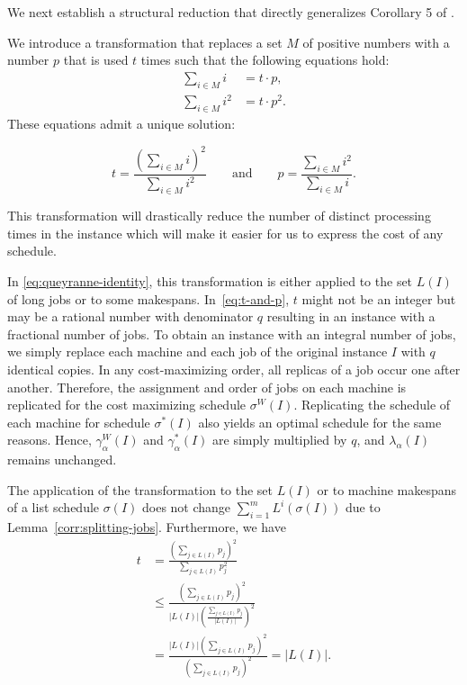 \documentclass[%
english, titlepage=false %
]{./tum-templates/book/tumbook}
\newcommand{\LamI}{\lambda_{\alpha}(I)}
\begin{document}
We next establish a structural reduction that directly generalizes Corollary 5 of \cite{Schwiegelshohn:2011}.

We introduce a transformation that replaces a set $M$ of positive
numbers with a number $p$ that is used $t$ times such that the following
equations hold:
\begin{align}
        \sum_{i\in M} i &= t\cdot p, \\
        \sum_{i\in M} i^2 &= t\cdot p^2.
\end{align}
These equations admit a unique solution:

\begin{equation}
\label{eq:t-and-p}
t=\frac{\left(\sum_{i\in M} i\right)^2}{\sum_{i\in M} i^2}
\qquad\text{and}\qquad
p=\frac{\sum_{i\in M} i^2}{\sum_{i\in M} i}.
\end{equation}

This transformation will drastically reduce the number of distinct processing times 
in the instance which will make it easier for us to express the cost of any schedule. 

In \eqref{eq:queyranne-identity}, this transformation is either applied to the set $L(I)$ of long
jobs or to some makespans. In~\eqref{eq:t-and-p}, $t$ might not be an integer but may be a
rational number with denominator $q$ resulting in an instance with a
fractional number of jobs. To obtain an instance with an integral number of
jobs, we simply replace each machine and each job of the original instance
$I$ with $q$ identical copies. In any cost-maximizing order, all replicas of a job occur
one after another. Therefore, the assignment and order of jobs on each machine is replicated for
the cost maximizing schedule $\sigma^{W}(I)$.
Replicating the schedule of each machine for schedule
$\sigma^{*}(I)$ also yields an optimal schedule for the same reasons. 
Hence, $\gamma^{W}_{\alpha}(I)$ and $\gamma^{*}_{\alpha}(I)$ are simply multiplied by $q$, and
$\LamI$ remains unchanged.

The application of the transformation to the set $L(I)$ or to machine
makespans of a list schedule $\sigma(I)$ does not change
$\sum_{i=1}^m L^{i}(\sigma(I))$ due to Lemma~\ref{corr:splitting-jobs}. 
Furthermore, we have
\begin{equation}
\begin{aligned}
        t
        &=
        \frac{\left(\sum_{j\in L(I)}p_j\right)^2}
        {\sum_{j\in L(I)}p_j^2}                                      \\
        &\leq
        \frac{\left(\sum_{j\in L(I)}p_j\right)^2}
        {|L(I)|\left(\frac{\sum_{j\in L(I)}p_j}{|L(I)|}\right)^2}       \\
        &=
        \frac{|L(I)|\left(\sum_{j\in L(I)}p_j\right)^2}
        {\left(\sum_{j\in L(I)}p_j\right)^2}
        =
        |L(I)|.
\end{aligned}
\end{equation}
\end{document}
